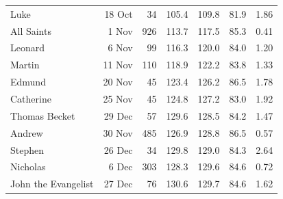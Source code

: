 \documentclass[11pt,a4paper]{article}
\begin{document}
\begin{longtable}{lrrrrrr}
Luke & 18 Oct & 34 & 105.4 & 109.8 & 81.9 & 1.86\\
All Saints & 1 Nov & 926 & 113.7 & 117.5 & 85.3 & 0.41\\
Leonard & 6 Nov & 99 & 116.3 & 120.0 & 84.0 & 1.20\\
Martin & 11 Nov & 110 & 118.9 & 122.2 & 83.8 & 1.33\\
Edmund & 20 Nov & 45 & 123.4 & 126.2 & 86.5 & 1.78\\
Catherine & 25 Nov & 45 & 124.8 & 127.2 & 83.0 & 1.92\\
Thomas Becket & 29 Dec & 57 & 129.6 & 128.5 & 84.2 & 1.47\\
Andrew & 30 Nov & 485 & 126.9 & 128.8 & 86.5 & 0.57\\
Stephen & 26 Dec & 34 & 129.8 & 129.0 & 84.3 & 2.64\\
Nicholas & 6 Dec & 303 & 128.3 & 129.6 & 84.6 & 0.72\\
John the Evangelist & 27 Dec & 76 & 130.6 & 129.7 & 84.6 & 1.62\\
\bottomrule\end{longtable}
\end{document}
